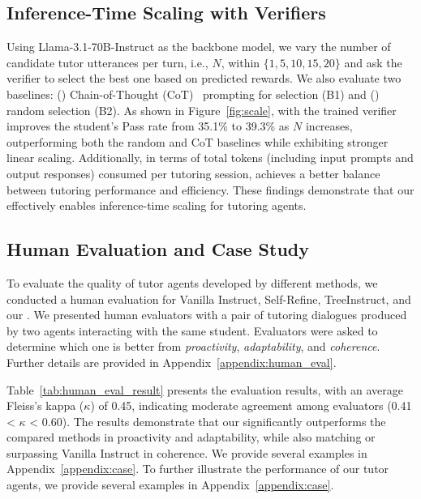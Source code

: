 \subsection{Inference-Time Scaling with Verifiers}
\label{sec:scaling_analysis}
Using Llama-3.1-70B-Instruct as the backbone model, we vary the number of candidate tutor utterances per turn, i.e., $N$, within $\{1, 5, 10, 15, 20\}$ and ask the verifier to select the best one based on predicted rewards. 
We also evaluate two baselines: () Chain-of-Thought (CoT)~\citep{wei2022chain} prompting for selection (B1) and () random selection (B2).
As shown in Figure~\ref{fig:scale}, \model with the trained verifier improves the student's Pass rate from 35.1\% to 39.3\% as $N$ increases, outperforming both the random and CoT baselines while exhibiting stronger linear scaling. 
Additionally, in terms of total tokens (including input prompts and output responses) consumed per tutoring session, \model achieves a better balance between tutoring performance and efficiency. These findings demonstrate that our \model effectively enables inference-time scaling for tutoring agents.



\subsection{Human Evaluation and Case Study}

To evaluate the quality of tutor agents developed by different methods, we conducted a human evaluation for Vanilla Instruct, Self-Refine, TreeInstruct, and our \model. 
We presented human evaluators with a pair of tutoring dialogues produced by two agents interacting with the same student. Evaluators were asked to determine which one is better from \textit{proactivity}, \textit{adaptability}, and \textit{coherence}. Further details are provided in Appendix~\ref{appendix:human_eval}.


Table~\ref{tab:human_eval_result} presents the evaluation results, with an average Fleiss’s kappa ($\kappa$) of 0.45, indicating moderate agreement among evaluators (0.41 < $\kappa$ < 0.60). The results demonstrate that our \model significantly outperforms the compared methods in proactivity and adaptability, while also matching or surpassing Vanilla Instruct in coherence. 
We provide several examples in Appendix~\ref{appendix:case}.
To further illustrate the performance of our tutor agents, we provide several examples in Appendix~\ref{appendix:case}.
